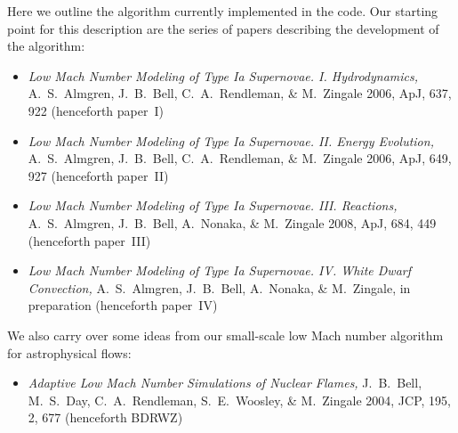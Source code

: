 Here we outline the algorithm currently implemented in the code.  Our
starting point for this description are the series of papers describing
the development of the algorithm:
\begin{itemize}
\item {\em Low Mach Number Modeling of Type Ia
  Supernovae. I. Hydrodynamics,} A.~S.~Almgren, J.~B.~Bell, 
  C.~A.~Rendleman, \& M.~Zingale 2006, ApJ, 637, 922 (henceforth
  paper~I)
\item {\em Low Mach Number Modeling of Type Ia Supernovae. II. Energy
  Evolution,} A.~S.~Almgren, J.~B.~Bell, C.~A.~Rendleman, \& M.~Zingale
  2006, ApJ, 649, 927 (henceforth paper~II)
\item {\em Low Mach Number Modeling of Type Ia Supernovae. III. Reactions,}
A.~S.~Almgren, J.~B.~Bell, A.~Nonaka, \& M.~Zingale
  2008, ApJ, 684, 449 (henceforth paper~III)
\item {\em Low Mach Number Modeling of Type Ia Supernovae. IV. White Dwarf Convection,}
A.~S.~Almgren, J.~B.~Bell, A.~Nonaka, \& M.~Zingale,
  in preparation (henceforth paper~IV)
\end{itemize}
We also carry over some ideas from our small-scale low Mach number algorithm
for astrophysical flows:
\begin{itemize}
\item {\em Adaptive Low Mach Number Simulations of Nuclear Flames,}
J.~B.~Bell, M.~S.~Day, C.~A.~Rendleman, S.~E.~Woosley, \& M.~Zingale
2004, JCP, 195, 2, 677 (henceforth BDRWZ)
\end{itemize}

